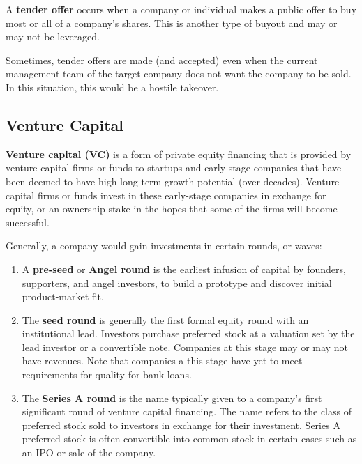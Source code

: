 \documentclass{article}
\begin{document}
    \begin{definition}
      A \textbf{tender offer} occurs when a company or individual makes a public offer to buy most or all of a company's shares. This is another type of buyout and may or may not be leveraged. 

      Sometimes, tender offers are made (and accepted) even when the current management team of the target company does not want the company to be sold. In this situation, this would be a hostile takeover. 
    \end{definition}

  \subsection{Venture Capital}

    \begin{definition}
      \textbf{Venture capital (VC)} is a form of private equity financing that is provided by venture capital firms or funds to startups and early-stage companies that have been deemed to have high long-term growth potential (over decades). Venture capital firms or funds invest in these early-stage companies in exchange for equity, or an ownership stake in the hopes that some of the firms will become successful. 

      Generally, a company would gain investments in certain rounds, or waves:
      \begin{enumerate}
        \item A \textbf{pre-seed} or \textbf{Angel round} is the earliest infusion of capital by founders, supporters, and angel investors, to build a prototype and discover initial product-market fit. 
        \item The \textbf{seed round} is generally the first formal equity round with an institutional lead. Investors purchase preferred stock at a valuation set by the lead investor or a convertible note. Companies at this stage may or may not have revenues. Note that companies a this stage have yet to meet requirements for quality for bank loans. 
        \item The \textbf{Series A round} is the name typically given to a company's first significant round of venture capital financing. The name refers to the class of preferred stock sold to investors in exchange for their investment. Series A preferred stock is often convertible into common stock in certain cases such as an IPO or sale of the company. 
        

\end{enumerate}
\end{definition}
\end{document}
